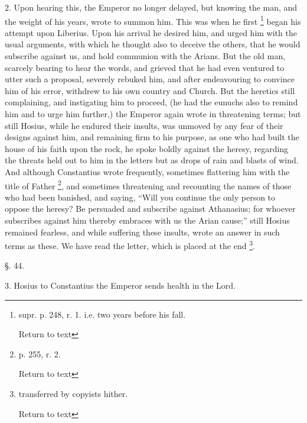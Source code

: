 2. Upon hearing this, the Emperor no longer
delayed, but knowing the man, and the weight of his years, wrote to
summon him. This was when he first \footnote{supr. p. 248, r. 1. i.e. two years before his fall.

Return to text} began his attempt upon Liberius. Upon his arrival he
desired him, and urged him with the usual arguments, with which he
thought also to deceive the others, that he would subscribe against
us, and hold communion with the Arians. But the old man, scarcely
bearing to hear the words, and grieved that he had even ventured to
utter such a proposal, severely rebuked him, and after endeavouring to
convince him of his error, withdrew to his own country and Church. But
the heretics still complaining, and instigating him to proceed, (he
had the eunuchs also to remind him and to urge him further,) the
Emperor again wrote in threatening terms; but still Hosius, while he
endured their insults, was unmoved by any fear of their designs
against him, and remaining firm to his purpose, as one who had built
the house of his faith upon the rock, he spoke boldly against the
heresy, regarding the threats held out to him in the letters but as
drops of rain and blasts of wind. And although Constantius wrote
frequently, sometimes flattering him with the title of Father \footnote{p. 255, r. 2.

Return to text}, and sometimes threatening and recounting the names of those
who had been banished, and saying, ``Will you continue the only person
to oppose the heresy? Be persuaded and subscribe against Athanasius;
for whoever subscribes against him thereby embraces with us the Arian
cause;'' still Hosius remained fearless, and while suffering these
insults, wrote an answer in such terms as these. We have read the
letter, which is placed at the end \footnote{transferred by copyists hither.

Return to text}.

§. 44.

3. Hosius to Constantius the Emperor sends health
in the Lord.

